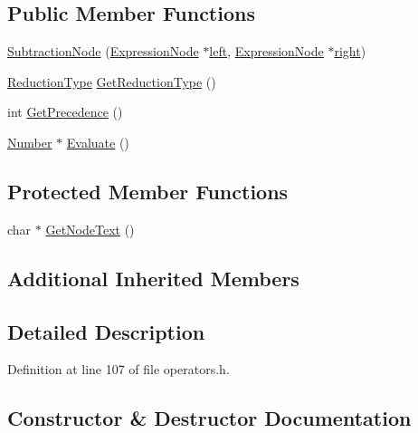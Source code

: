 \subsection*{Public Member Functions}
\begin{DoxyCompactItemize}
\item 
\hyperlink{classSubtractionNode_a1c08339ecfc99430eec6db0b7687c716}{Subtraction\+Node} (\hyperlink{classExpressionNode}{Expression\+Node} $\ast$\hyperlink{classNumericOperator_a55da3c4075408deff978711030fa8258}{left}, \hyperlink{classExpressionNode}{Expression\+Node} $\ast$\hyperlink{classNumericOperator_aa2c5b5bea59bbb068bc6013bc5cac483}{right})
\item 
\hyperlink{nodes_8h_ab321a69ad5704b704b8dd9e1b3984a29}{Reduction\+Type} \hyperlink{classSubtractionNode_a4116ea8e86864be1a1ae9420d2b93ac4}{Get\+Reduction\+Type} ()
\item 
int \hyperlink{classSubtractionNode_aab0c25ea71d027f844bc332fa0045b6c}{Get\+Precedence} ()
\item 
\hyperlink{structNumber}{Number} $\ast$ \hyperlink{classSubtractionNode_a6ab885bb5ab826b5d0c70a63e753f5e3}{Evaluate} ()
\end{DoxyCompactItemize}
\subsection*{Protected Member Functions}
\begin{DoxyCompactItemize}
\item 
char $\ast$ \hyperlink{classSubtractionNode_a93deba99c167e46fcb71b129902168de}{Get\+Node\+Text} ()
\end{DoxyCompactItemize}
\subsection*{Additional Inherited Members}


\subsection{Detailed Description}


Definition at line 107 of file operators.\+h.



\subsection{Constructor \& Destructor Documentation}
